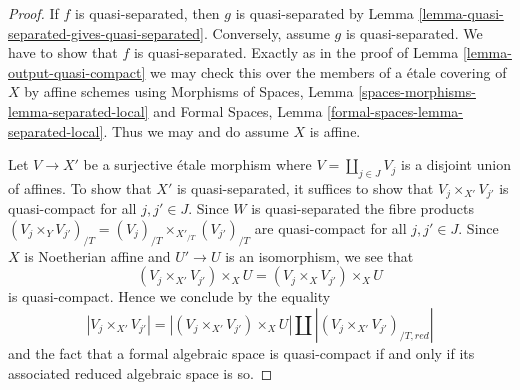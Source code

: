 \documentclass[10pt,a4paper]{amsart}
\theoremstyle{plain}
\theoremstyle{definition}
\theoremstyle{remark}
\numberwithin{equation}{subsection}
\begin{document}
\begin{proof}
If $f$ is quasi-separated, then $g$ is quasi-separated by
Lemma \ref{lemma-quasi-separated-gives-quasi-separated}.
Conversely, assume $g$ is quasi-separated. We have to show
that $f$ is quasi-separated. Exactly as in the proof
of Lemma \ref{lemma-output-quasi-compact} we may check
this over the members of a \'etale covering of $X$ by affine schemes
using Morphisms of Spaces, Lemma
\ref{spaces-morphisms-lemma-separated-local}
and Formal Spaces, Lemma
\ref{formal-spaces-lemma-separated-local}.
Thus we may and do assume $X$ is affine.

\medskip\noindent
Let $V \to X'$ be a surjective \'etale morphism
where $V = \coprod_{j \in J} V_j$ is a disjoint union of affines.
To show that $X'$ is quasi-separated, it suffices to show that
$V_j \times_{X'} V_{j'}$ is quasi-compact for all $j, j' \in J$.
Since $W$ is quasi-separated the fibre products
$(V_j \times_Y V_{j'})_{/T} = (V_j)_{/T} \times_{X'_{/T}} (V_{j'})_{/T}$
are quasi-compact for all $j, j' \in J$. Since $X$ is Noetherian affine
and $U' \to U$ is an isomorphism, we see that
$$
(V_j \times_{X'} V_{j'}) \times_X U =
(V_j \times_X V_{j'}) \times_X U
$$
is quasi-compact. Hence we conclude by the equality
$$
|V_j \times_{X'} V_{j'}| =
|(V_j \times_{X'} V_{j'}) \times_X U| \amalg
|(V_j \times_{X'} V_{j'})_{/T, red}|
$$
and the fact that a formal algebraic space is quasi-compact if and
only if its associated reduced algebraic space is so.
\end{proof}
\end{document}

